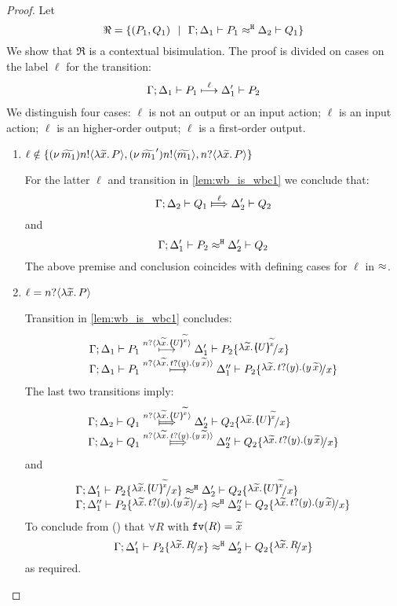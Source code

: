 \begin{proof}
	Let
	\[
		\Re = \{(P_1, Q_1) \ \ |\ \  \Gamma; \Delta_1 \vdash P_1 \approx^\mathtt{H} \Delta_2 \vdash Q_1\}
	\]
	We show that $\Re$ is a contextual bisimulation.
	The proof is divided on cases on the label $\ell$ for the transition:
%
	\begin{eqnarray}
		\Gamma; \Delta_1 \vdash P_1 \stackrel{\ell}{\longmapsto} \Delta_1' \vdash P_2
		\label{lem:wb_is_wbc1}
	\end{eqnarray}
%
We distinguish four cases: $\ell$ is not an output or an input action; $\ell$ is an input action;
$\ell$ is an higher-order output; $\ell$ is a first-order output.
	\begin{enumerate}
		\item
				$\ell \notin \{ (\nu\, \widetilde{m_1}) n ! \langle \lambda \widetilde{x}.\,P \rangle,  (\nu\, \widetilde{m_1}') n ! \langle \widetilde{m_1} \rangle, n ? \langle \lambda \widetilde{x}.\,P \rangle \}$

				\noi For the latter $\ell$ and transition in \eqref{lem:wb_is_wbc1} we conclude that:	
				\[
					\horel{\Gamma}{\Delta_2}{Q_1}{\Hby{\ell}}{\Delta_2'}{Q_2}
				\]
				\noi and
				\[
					\Gamma; \Delta_1' \vdash P_2 \approx^\mathtt{H} \Delta_2' \vdash Q_2
				\]
				The above premise and conclusion coincides with defining cases for $\ell$ in $\approx$.

		\item	$\ell = n ? \langle \lambda \widetilde{x}.\,P \rangle$

				\noi Transition in \eqref{lem:wb_is_wbc1} concludes:
				\[
					\begin{array}{l}
						\horel{\Gamma}{\Delta_1}{P_1}{\hby{\bactinp{n}{\abs{\widetilde{x}}{\mapchar{U}{\widetilde{x}}}}}}{\Delta_1'}{P_2 \subst{\abs{\widetilde{x}}{\mapchar{U}{\widetilde{x}}}}{x}}\\
						\horel{\Gamma}{\Delta_1}{P_1}{\hby{\bactinp{n}{\auxtr{t}}}}{\Delta_1''}{P_2 \subst{\auxtr{t}}{x}}
					\end{array}
				\]
				\noi The last two transitions imply:
			\[
				\begin{array}{l}
					\horel{\Gamma}{\Delta_2}{Q_1}{\Hby{\bactinp{n}{\abs{\widetilde{x}}{\mapchar{U}{\widetilde{x}}}}}}{\Delta_2'}{Q_2 \subst{\abs{\widetilde{x}}{\mapchar{U}{\widetilde{x}}}}{x}}\\
					\horel{\Gamma}{\Delta_2}{Q_1}{\Hby{\bactinp{n}{\auxtr{t}}}}{\Delta_2''}{Q_2 \subst{\auxtr{t}}{x}}
				\end{array}
			\]
				\noi and
			\[
				\begin{array}{l}
					\horel{\Gamma}{\Delta_1'}{P_2 \subst{\abs{\widetilde{x}}{\mapchar{U}{\widetilde{x}}}}{x}}{\hwb}{\Delta_2'}{Q_2 \subst{\abs{\widetilde{x}}{\mapchar{U}{\widetilde{x}}}}{x}}\\
					\horel{\Gamma}{\Delta_1''}{P_2 \subst{\auxtr{t}}{x}}{\hwb}{\Delta_2''}{Q_2 \subst{\auxtr{t}}{x}}
				\end{array}
			\]
				\noi To conclude from () that
				$\forall R$ with $\mathtt{fv}(R) = \widetilde{x}$
			\[
				\horel{\Gamma}{\Delta_1'}{P_2 \subst{\abs{\widetilde{x}}{R}}{x}}{\hwb}{\Delta_2'}{Q_2 \subst{\abs{\widetilde{x}}{R}}{x}}
			\]
				\noi as required.


\end{enumerate}
\end{proof}
